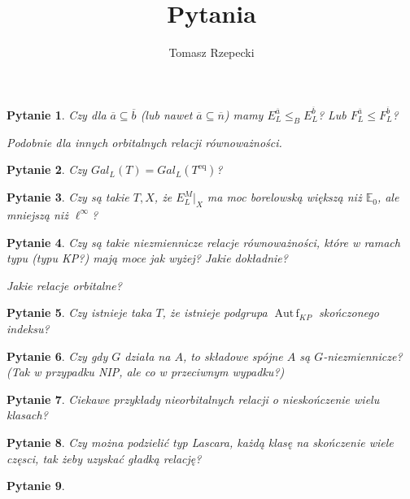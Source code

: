 \documentclass[11pt,leqno]{amsart}
\newtheorem{pyt}{Pytanie}
\theoremstyle{remark}
\theoremstyle{definition}
\newcommand{\Autf}[1]{\operatorname{Aut\,f}_{#1}}
\begin{document}
\author{Tomasz Rzepecki}
\title{Pytania}
\begin{pyt}
Czy dla $\overline a\subseteq \overline b$ (lub nawet $\overline a\subseteq\overline n$) mamy $E^{\overline a}_L\leq_B E^{\overline b}_L$? Lub $F^{\overline a}_L\leq F^{\overline b}_L$?

Podobnie dla innych orbitalnych relacji równoważności.
\end{pyt}

\begin{pyt}
Czy $Gal_L(T)=Gal_L(T^{\textrm{eq}})$?
\end{pyt}

\begin{pyt}
Czy są takie $T,X$, że $E^M_L\vert_X$ ma moc borelowską większą niż $\mathbb E_0$, ale mniejszą niż $\ell^\infty$?
\end{pyt}

\begin{pyt}
Czy są takie niezmiennicze relacje równoważności, które w ramach typu (typu KP?) mają moce jak wyżej? Jakie dokładnie?

Jakie relacje orbitalne?
\end{pyt}

\begin{pyt}
Czy istnieje taka $T$, że istnieje podgrupa $\Autf {KP}$ skończonego indeksu?
\end{pyt}

\begin{pyt}
Czy gdy $G$ działa na $A$, to składowe spójne $A$ są $G$-niezmiennicze? (Tak w przypadku NIP, ale co w przeciwnym wypadku?)
\end{pyt}

\begin{pyt}
Ciekawe przykłady nieorbitalnych relacji o nieskończenie wielu klasach?
\end{pyt}

\begin{pyt}
Czy można podzielić typ Lascara, każdą klasę na skończenie wiele częsci, tak żeby uzyskać gładką relację?
\end{pyt}

\begin{pyt}

\end{pyt}
\end{document}
